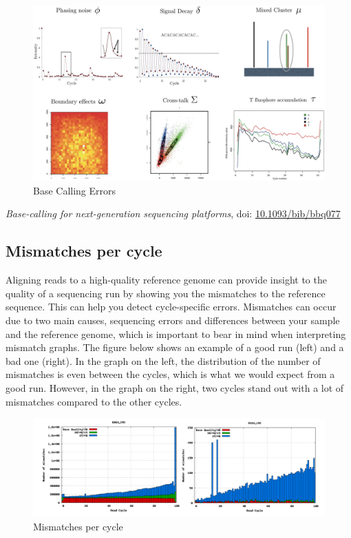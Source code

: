 \documentclass[11pt]{article}
\begin{document}
    \begin{figure}[!h]
\centering
\includegraphics{img/base_calling_errors.jpg}
\caption{Base Calling Errors}
\end{figure}

    \textit{Base-calling for next-generation sequencing platforms}, doi:
\href{https://academic.oup.com/bib/article/12/5/489/268399}{10.1093/bib/bbq077}

\hypertarget{mismatches-per-cycle}{%

\pagebreak

\subsection{Mismatches per cycle}\label{mismatches-per-cycle}}

Aligning reads to a high-quality reference genome can provide insight to
the quality of a sequencing run by showing you the mismatches to the
reference sequence. This can help you detect cycle-specific errors.
Mismatches can occur due to two main causes, sequencing errors and
differences between your sample and the reference genome, which is
important to bear in mind when interpreting mismatch graphs. The figure
below shows an example of a good run (left) and a bad one (right). In
the graph on the left, the distribution of the number of mismatches is
even between the cycles, which is what we would expect from a good run.
However, in the graph on the right, two cycles stand out with a lot of
mismatches compared to the other cycles.

    \begin{figure}[!h]
\centering
\includegraphics{img/mismatch_per_cycle_comparison.png}
\caption{Mismatches per cycle}
\end{figure}
\end{document}
